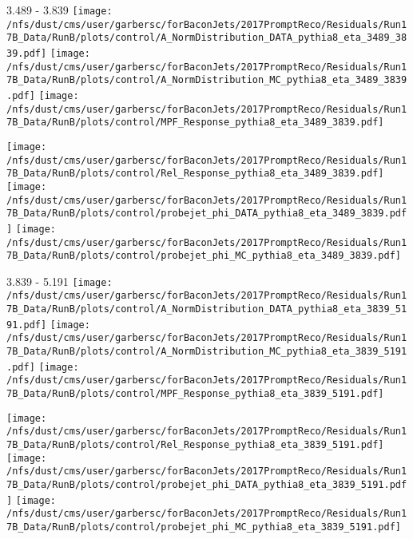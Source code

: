 \documentclass[t,compress]{beamer}
\begin{document}
\begin{frame}{3.489 - 3.839}
	\texttt{[image: /nfs/dust/cms/user/garbersc/forBaconJets/2017PromptReco/Residuals/Run17B\_Data/RunB/plots/control/A\_NormDistribution\_DATA\_pythia8\_eta\_3489\_3839.pdf]}
	\texttt{[image: /nfs/dust/cms/user/garbersc/forBaconJets/2017PromptReco/Residuals/Run17B\_Data/RunB/plots/control/A\_NormDistribution\_MC\_pythia8\_eta\_3489\_3839.pdf]}
	\texttt{[image: /nfs/dust/cms/user/garbersc/forBaconJets/2017PromptReco/Residuals/Run17B\_Data/RunB/plots/control/MPF\_Response\_pythia8\_eta\_3489\_3839.pdf]}
\newline

	\texttt{[image: /nfs/dust/cms/user/garbersc/forBaconJets/2017PromptReco/Residuals/Run17B\_Data/RunB/plots/control/Rel\_Response\_pythia8\_eta\_3489\_3839.pdf]}
	\texttt{[image: /nfs/dust/cms/user/garbersc/forBaconJets/2017PromptReco/Residuals/Run17B\_Data/RunB/plots/control/probejet\_phi\_DATA\_pythia8\_eta\_3489\_3839.pdf]}
	\texttt{[image: /nfs/dust/cms/user/garbersc/forBaconJets/2017PromptReco/Residuals/Run17B\_Data/RunB/plots/control/probejet\_phi\_MC\_pythia8\_eta\_3489\_3839.pdf]}
\end{frame}

\begin{frame}{3.839 - 5.191}
	\texttt{[image: /nfs/dust/cms/user/garbersc/forBaconJets/2017PromptReco/Residuals/Run17B\_Data/RunB/plots/control/A\_NormDistribution\_DATA\_pythia8\_eta\_3839\_5191.pdf]}
	\texttt{[image: /nfs/dust/cms/user/garbersc/forBaconJets/2017PromptReco/Residuals/Run17B\_Data/RunB/plots/control/A\_NormDistribution\_MC\_pythia8\_eta\_3839\_5191.pdf]}
	\texttt{[image: /nfs/dust/cms/user/garbersc/forBaconJets/2017PromptReco/Residuals/Run17B\_Data/RunB/plots/control/MPF\_Response\_pythia8\_eta\_3839\_5191.pdf]}
\newline

	\texttt{[image: /nfs/dust/cms/user/garbersc/forBaconJets/2017PromptReco/Residuals/Run17B\_Data/RunB/plots/control/Rel\_Response\_pythia8\_eta\_3839\_5191.pdf]}
	\texttt{[image: /nfs/dust/cms/user/garbersc/forBaconJets/2017PromptReco/Residuals/Run17B\_Data/RunB/plots/control/probejet\_phi\_DATA\_pythia8\_eta\_3839\_5191.pdf]}
	\texttt{[image: /nfs/dust/cms/user/garbersc/forBaconJets/2017PromptReco/Residuals/Run17B\_Data/RunB/plots/control/probejet\_phi\_MC\_pythia8\_eta\_3839\_5191.pdf]}
\end{frame}
\end{document}
